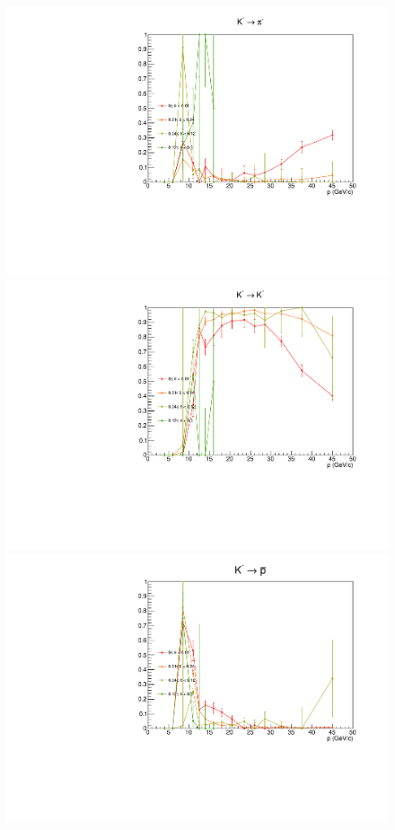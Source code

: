 \begin{figure}[!p]
  \centering
	\includegraphics[scale=0.38]{./gfx/Km_pi_less.pdf}
  \includegraphics[scale=0.38]{./gfx/Km_K_less.pdf}
  \includegraphics[scale=0.38]{./gfx/Km_p_less.pdf}

\end{figure}
